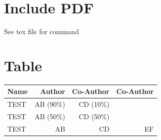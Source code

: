 \begin{figure}[H]
\begin{figure}[H]
\begin{figure}[H]
    \centering
    \label{THISLABEL6}
\end{figure}

\chapter{Include PDF}

See tex file for command

%

\chapter{Table}

\begin{table}[H]
    \centering
    \begin{tabular}{|l|r|r|r|}
        \hline
        \textbf{Name}&\textbf{Author}&\textbf{Co-Author}&\textbf{Co-Author}\Tstrut\Bstrut\\
        \hline
        TEST & AB (90\%) & CD (10\%) & \Tstrut\\
        TEST & AB (50\%) & CD (50\%) & \\
        TEST & AB & CD & EF \Bstrut\\
        \hline
    \end{tabular}
\end{table}


\end{figure}
\end{figure}
